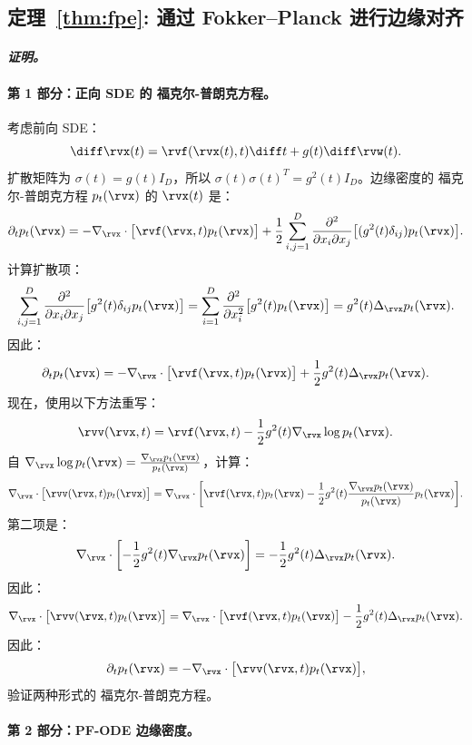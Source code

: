 \subsection{定理~\ref{thm:fpe}: 通过 Fokker–Planck 进行边缘对齐}\label{app-sec:scoresde-fpe-proof}

\paragraph{\textit{证明。}}
\paragraph{第 1 部分：正向 SDE 的 福克尔-普朗克方程。}

考虑前向 SDE：
\[
\diff \rvx(t) = \rvf(\rvx(t), t)  \diff t + g(t)  \diff \rvw(t).
\]
扩散矩阵为 $\sigma(t) = g(t) I_D$，所以 $\sigma(t) \sigma(t)^T = g^2(t) I_D$。边缘密度的 福克尔-普朗克方程 $p_t(\rvx)$ 的 $\rvx(t)$ 是：
\[
\partial_t p_t(\rvx) = -\nabla_{\rvx} \cdot \bigl[ \rvf(\rvx, t) p_t(\rvx) \bigr] + \frac{1}{2} \sum_{i,j=1}^D \frac{\partial^2}{\partial x_i \partial x_j} \bigl[ (g^2(t) \delta_{ij}) p_t(\rvx) \bigr].
\]
计算扩散项：
\[
\sum_{i,j=1}^D \frac{\partial^2}{\partial x_i \partial x_j} \bigl[ g^2(t) \delta_{ij} p_t(\rvx) \bigr] = \sum_{i=1}^D \frac{\partial^2}{\partial x_i^2} \bigl[ g^2(t) p_t(\rvx) \bigr] = g^2(t) \Delta_{\rvx} p_t(\rvx).
\]
因此：
\[
\partial_t p_t(\rvx) = -\nabla_{\rvx} \cdot \bigl[ \rvf(\rvx, t) p_t(\rvx) \bigr] + \frac{1}{2} g^2(t) \Delta_{\rvx} p_t(\rvx).
\]
现在，使用以下方法重写：
\[
\rvv(\rvx, t) = \rvf(\rvx, t) - \frac{1}{2} g^2(t) \nabla_{\rvx} \log p_t(\rvx).
\]
自 $\nabla_{\rvx} \log p_t(\rvx) = \frac{\nabla_{\rvx} p_t(\rvx)}{p_t(\rvx)}$，计算：
\[
\nabla_{\rvx} \cdot \bigl[ \rvv(\rvx, t) p_t(\rvx) \bigr] = \nabla_{\rvx} \cdot \biggl[ \rvf(\rvx, t) p_t(\rvx) - \frac{1}{2} g^2(t) \frac{\nabla_{\rvx} p_t(\rvx)}{p_t(\rvx)} p_t(\rvx) \biggr].
\]
第二项是：
\[
\nabla_{\rvx} \cdot \biggl[ -\frac{1}{2} g^2(t) \nabla_{\rvx} p_t(\rvx) \biggr] = -\frac{1}{2} g^2(t) \Delta_{\rvx} p_t(\rvx).
\]
因此：
\[
\nabla_{\rvx} \cdot \bigl[ \rvv(\rvx, t) p_t(\rvx) \bigr] = \nabla_{\rvx} \cdot \bigl[ \rvf(\rvx, t) p_t(\rvx) \bigr] - \frac{1}{2} g^2(t) \Delta_{\rvx} p_t(\rvx).
\]
因此：
\[
\partial_t p_t(\rvx) = -\nabla_{\rvx} \cdot \bigl[ \rvv(\rvx, t) p_t(\rvx) \bigr],
\]
验证两种形式的 福克尔-普朗克方程。

\paragraph{第 2 部分：PF-ODE 边缘密度。}

